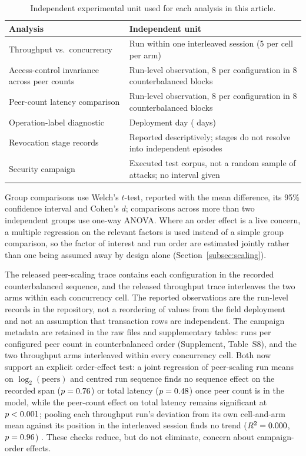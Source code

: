 \documentclass[a4paper,fleqn]{cas-dc}
\begin{document}
\begin{table}[pos=t]
\caption{Independent experimental unit used for each analysis in this article.}
\label{tab:units}
\small
\begin{tabularx}{\columnwidth}{@{}lX@{}}
\toprule
Analysis & Independent unit \\
\midrule
Throughput vs.\ concurrency &
  Run within one interleaved session (5 per cell per arm) \\
Access-control invariance across peer counts &
  Run-level observation, 8 per configuration in 8 counterbalanced blocks \\
Peer-count latency comparison &
  Run-level observation, 8 per configuration in 8 counterbalanced blocks \\
Operation-label diagnostic &
  Deployment day (\DeployDays{} days) \\
Revocation stage records &
  Reported descriptively; stages do not resolve into independent episodes \\
Security campaign &
  Executed test corpus, not a random sample of attacks; no interval given \\
\bottomrule
\end{tabularx}
\end{table}

Group comparisons use Welch's $t$-test, reported with the mean difference,
its 95\% confidence interval and Cohen's $d$; comparisons across more than
two independent groups use one-way ANOVA. Where an order effect is a live
concern, a multiple regression on the relevant factors is used instead of a
simple group comparison, so the factor of interest and run order are
estimated jointly rather than one being assumed away by design alone
(Section~\ref{subsec:scaling}).

The released peer-scaling trace contains each configuration in the recorded
counterbalanced sequence, and the released throughput trace interleaves the
two arms within each concurrency cell. The reported observations are the
run-level records in the repository, not a reordering of values from the
field deployment and not an assumption that transaction rows are
independent. The campaign metadata are retained in the raw files and
supplementary tables: \PartRunsPerConfig{} runs per configured peer count in
counterbalanced order (Supplement, Table~S8), and the two throughput arms
interleaved within every concurrency cell. Both now support an explicit
order-effect
test: a joint regression of peer-scaling run means on $\log_2(\text{peers})$
and centred run sequence finds no sequence effect on the recorded span
($p=0.76$) or total latency ($p=0.48$) once
peer count is in the model, while the peer-count effect on total latency
remains significant at $p<0.001$; pooling each throughput
run's deviation from its own cell-and-arm mean against its position in the
interleaved session finds no trend ($R^2=0.000$, $p=0.96$)
. These checks reduce, but do not eliminate, concern about campaign-order
effects.
\end{document}
